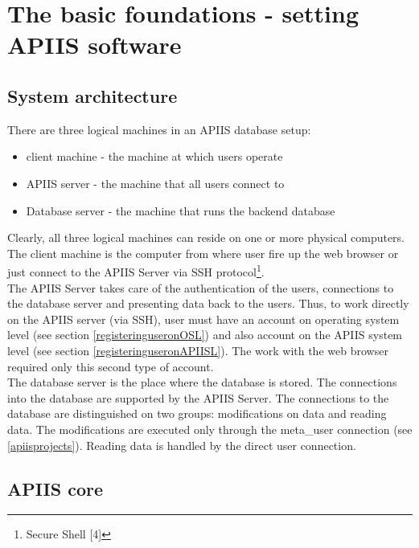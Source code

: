 


\section{The basic foundations - setting APIIS software\label{settingapiis}}

\subsection{System architecture\label{systemarchitecture}}
There are three logical machines in an APIIS database setup: 
\begin{itemize}
\item client machine - the machine at which users operate
\item APIIS server - the machine that all users connect to
\item Database server - the machine that runs the backend database
\end{itemize} 
Clearly, all three logical machines can reside on one or more physical computers.\\
The client machine is the computer from where user fire up the web browser or just connect to the APIIS Server via SSH protocol\footnote{Secure Shell [4]}.\\
The APIIS Server takes care of the authentication of the users, connections to the database server and presenting data back to the users. Thus, to work directly on the APIIS server (via SSH), user must have an account on operating system level (see section \ref{registeringuseronOSL}) and also account on the APIIS system level (see section \ref{registeringuseronAPIISL}). The work with the web browser required only this second type of account.\\
The database server is the place where the database is stored. The connections into the database are supported by the APIIS Server. The connections to the database are distinguished on two groups: modifications on data and reading data. The modifications are executed only through the meta\_user connection (see \ref{apiisprojects}). Reading data is handled by the direct user connection.


\subsection{APIIS core\label{apiiscore}}

